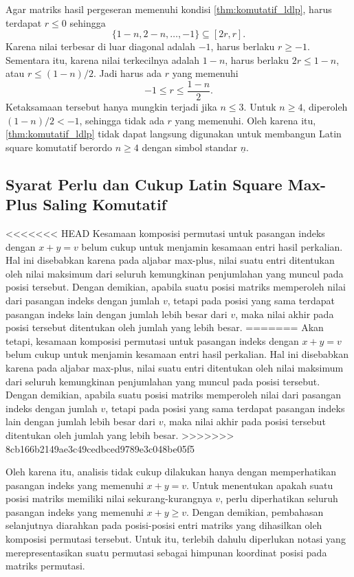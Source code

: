 Agar matriks hasil pergeseran memenuhi kondisi \autoref{thm:komutatif_ldlp},
harus terdapat $r\le 0$ sehingga
\[
  \{1-n,2-n,\ldots,-1\}\subseteq [2r,r].
\]
Karena nilai terbesar di luar diagonal adalah $-1$, harus berlaku $r\ge -1$.
Sementara itu, karena nilai terkecilnya adalah $1-n$, harus berlaku
$2r\le 1-n$, atau $r\le (1-n)/2$. Jadi harus ada $r$ yang memenuhi
\[
  -1\le r\le \frac{1-n}{2}.
\]
Ketaksamaan tersebut hanya mungkin terjadi jika $n\le 3$. Untuk $n\ge 4$,
diperoleh $(1-n)/2<-1$, sehingga tidak ada $r$ yang memenuhi. Oleh karena
itu, \autoref{thm:komutatif_ldlp} tidak dapat langsung digunakan untuk
membangun Latin square komutatif berordo $n\ge 4$ dengan simbol standar
$\underline{n}$.

\subsection{Syarat Perlu dan Cukup Latin Square Max-Plus Saling Komutatif}

<<<<<<< HEAD
Kesamaan komposisi permutasi untuk pasangan indeks dengan $x+y=v$ belum cukup untuk menjamin kesamaan entri hasil perkalian. Hal ini disebabkan karena pada aljabar max-plus, nilai suatu entri ditentukan oleh nilai maksimum dari seluruh kemungkinan penjumlahan yang muncul pada posisi tersebut. Dengan demikian, apabila suatu posisi matriks memperoleh nilai dari pasangan indeks dengan jumlah $v$, tetapi pada posisi yang sama terdapat pasangan indeks lain dengan jumlah lebih besar dari $v$, maka nilai akhir pada posisi tersebut ditentukan oleh jumlah yang lebih besar.
=======
Akan tetapi, kesamaan komposisi permutasi untuk pasangan indeks dengan $x+y=v$ belum cukup untuk menjamin kesamaan entri hasil perkalian. Hal ini disebabkan karena pada aljabar max-plus, nilai suatu entri ditentukan oleh nilai maksimum dari seluruh kemungkinan penjumlahan yang muncul pada posisi tersebut. Dengan demikian, apabila suatu posisi matriks memperoleh nilai dari pasangan indeks dengan jumlah $v$, tetapi pada posisi yang sama terdapat pasangan indeks lain dengan jumlah lebih besar dari $v$, maka nilai akhir pada posisi tersebut ditentukan oleh jumlah yang lebih besar.
>>>>>>> 8cb166b2149ae3c49cedbced9789e3c048be05f5

Oleh karena itu, analisis tidak cukup dilakukan hanya dengan memperhatikan pasangan indeks yang memenuhi $x+y=v$. Untuk menentukan apakah suatu posisi matriks memiliki nilai sekurang-kurangnya $v$, perlu diperhatikan seluruh pasangan indeks yang memenuhi
$
  x+y\ge v.
$
Dengan demikian, pembahasan selanjutnya diarahkan pada posisi-posisi entri matriks yang dihasilkan oleh komposisi permutasi tersebut. Untuk itu, terlebih dahulu diperlukan notasi yang merepresentasikan suatu permutasi sebagai himpunan koordinat posisi pada matriks permutasi.

